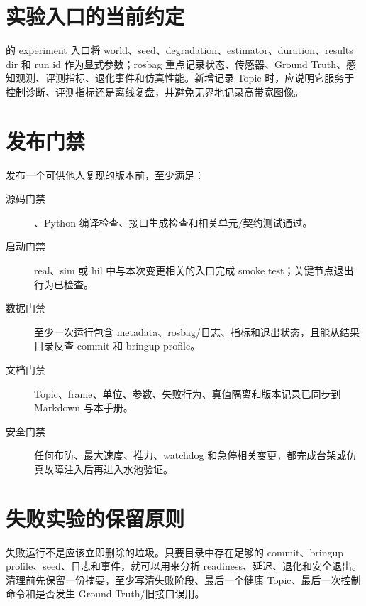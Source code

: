 \section{实验入口的当前约定}
 的 experiment 入口将 world、seed、degradation、estimator、duration、results dir 和 run id 作为显式参数；rosbag 重点记录状态、传感器、Ground Truth、感知观测、评测指标、退化事件和仿真性能。新增记录 Topic 时，应说明它服务于控制诊断、评测指标还是离线复盘，并避免无界地记录高带宽图像。

\section{发布门禁}
发布一个可供他人复现的版本前，至少满足：

\begin{description}
  \item[源码门禁] 、Python 编译检查、接口生成检查和相关单元/契约测试通过。
  \item[启动门禁] real、sim 或 hil 中与本次变更相关的入口完成 smoke test；关键节点退出行为已检查。
  \item[数据门禁] 至少一次运行包含 metadata、rosbag/日志、指标和退出状态，且能从结果目录反查 commit 和 bringup profile。
  \item[文档门禁] Topic、frame、单位、参数、失败行为、真值隔离和版本记录已同步到 Markdown 与本手册。
  \item[安全门禁] 任何布防、最大速度、推力、watchdog 和急停相关变更，都完成台架或仿真故障注入后再进入水池验证。
\end{description}

\section{失败实验的保留原则}
失败运行不是应该立即删除的垃圾。只要目录中存在足够的 commit、bringup profile、seed、日志和事件，就可以用来分析 readiness、延迟、退化和安全退出。清理前先保留一份摘要，至少写清失败阶段、最后一个健康 Topic、最后一次控制命令和是否发生 Ground Truth/旧接口误用。
